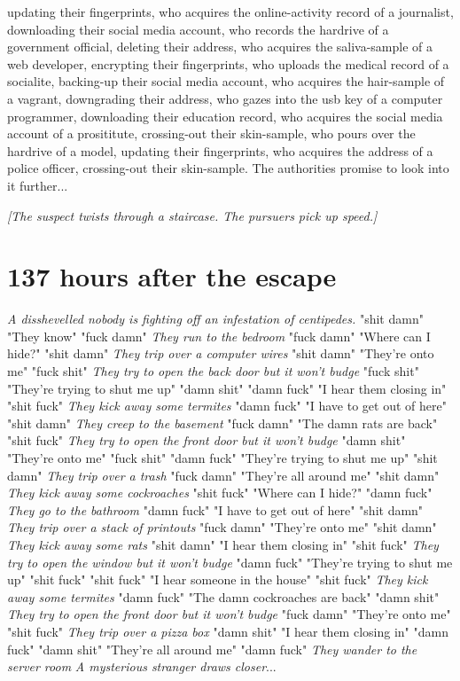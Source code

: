 \documentclass{report}
\begin{document}
updating their fingerprints, who acquires the online-activity record of a journalist, downloading their social media account, who records the hardrive of a government official, deleting their address, who acquires the saliva-sample of a web developer, encrypting their fingerprints, who uploads the medical record of a socialite, backing-up their social media account, who acquires the hair-sample of a vagrant, downgrading their address, who gazes into the usb key of a computer programmer, downloading their education record, who acquires the social media account of a prosititute, crossing-out their skin-sample, who pours over the hardrive of a model, updating their fingerprints, who acquires the address of a police officer, crossing-out their skin-sample. The authorities promise to look into it further...

\textit{[The suspect twists through a staircase. The pursuers pick up speed.]}


\section*{137 \small{hours after the escape}}

\textit{A disshevelled nobody is fighting off an infestation of centipedes.} "shit damn" "They know" "fuck damn" \textit{They run to the bedroom} "fuck damn" "Where can I hide?" "shit damn" \textit{They trip over a computer wires} "shit damn" "They're onto me" "fuck shit" \textit{They try to open the back door but it won't budge} "fuck shit" "They're trying to shut me up" "damn shit" \textit{} "damn fuck" "I hear them closing in" "shit fuck" \textit{They kick away some termites} "damn fuck" "I have to get out of here" "shit damn" \textit{They creep to the basement} "fuck damn" "The damn rats are back" "shit fuck" \textit{They try to open the front door but it won't budge} "damn shit" "They're onto me" "fuck shit" \textit{} "damn fuck" "They're trying to shut me up" "shit damn" \textit{They trip over a trash} "fuck damn" "They're all around me" "shit damn" \textit{They kick away some cockroaches} "shit fuck" "Where can I hide?" "damn fuck" \textit{They go to the bathroom} "damn fuck" "I have to get out of here" "shit damn" \textit{They trip over a stack of printouts} "fuck damn" "They're onto me" "shit damn" \textit{They kick away some rats} "shit damn" "I hear them closing in" "shit fuck" \textit{They try to open the window but it won't budge} "damn fuck" "They're trying to shut me up" "shit fuck" \textit{} "shit fuck" "I hear someone in the house" "shit fuck" \textit{They kick away some termites} "damn fuck" "The damn cockroaches are back" "damn shit" \textit{They try to open the front door but it won't budge} "fuck damn" "They're onto me" "shit fuck" \textit{They trip over a pizza box} "damn shit" "I hear them closing in" "damn fuck" \textit{} "damn shit" "They're all around me" "damn fuck" \textit{They wander to the server room} \textit{A mysterious stranger draws closer}...
\end{document}
